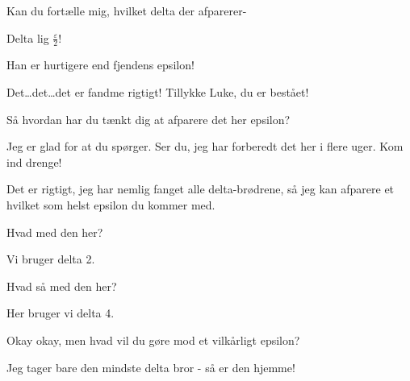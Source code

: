 \documentclass[a4paper,11pt]{article}
\begin{document}
\begin{sketch}

 Kan du fortælle mig, hvilket delta der afparerer-

 Delta lig $\frac{\varepsilon}{2}$!

 Han er hurtigere end fjendens epsilon!

 Det…det…det er fandme rigtigt! Tillykke Luke, du er bestået!


 Så hvordan har du tænkt dig at afparere det her epsilon?

 Jeg er glad for at du spørger. Ser du, jeg har forberedt det her i flere uger. Kom ind drenge!


 Det er rigtigt, jeg har nemlig fanget alle delta-brødrene, så jeg kan afparere et hvilket som helst epsilon du kommer med.

 Hvad med den her?

 Vi bruger delta 2.

 Hvad så med den her?

 Her bruger vi delta 4.

 Okay okay, men hvad vil du gøre mod et vilkårligt epsilon?

 Jeg tager bare den mindste delta bror - så er den hjemme!

\end{sketch}
\end{document}
